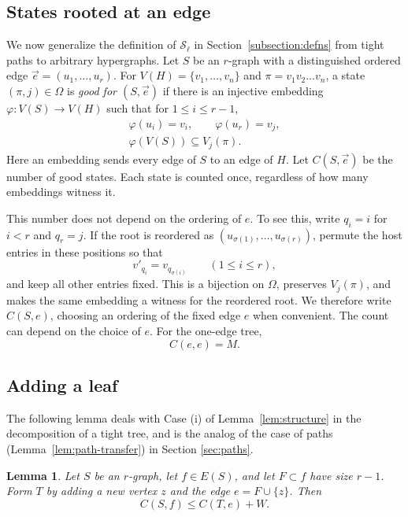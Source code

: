\documentclass[11pt]{article}
\newtheorem{lemma}[theorem]{Lemma}
\theoremstyle{remark}
\numberwithin{equation}{section}
\begin{document}
	\subsection{States rooted at an edge}\label{subsec:rooted-states}
	We now generalize the definition of ${\mathcal S}_{\ell}$ in Section~\ref{subsection:defns} from tight paths to arbitrary hypergraphs.
	Let $S$ be an $r$-graph with a distinguished ordered edge
	$\vec e=(u_1,\ldots,u_r)$. For $V(H)=\{v_1, \ldots, v_n\}$ and $\pi=v_1v_2\ldots v_n$, a state $(\pi,j)\in\Omega$ is
	\emph{good for $(S,\vec e)$} if there is an injective embedding
	$\varphi:V(S)\longrightarrow V(H)$ such that for $1 \leq i \leq r-1$,
	\begin{equation}\label{eq:rooted-state}
		\begin{gathered}
			\varphi(u_i)=v_i,\qquad \varphi(u_r)=v_j,\\
			\varphi(V(S))\subseteq V_j(\pi).
		\end{gathered}
	\end{equation}
	Here an embedding sends every edge of $S$ to an edge of $H$.
	Let $C(S,\vec e)$ be the number of good states. Each state is
	counted once, regardless of how many embeddings witness it.
	
	This number does not depend on the ordering of $e$. To see this,
	write $q_i=i$ for $i<r$ and $q_r=j$. If the root is reordered as
	$(u_{\sigma(1)},\ldots,u_{\sigma(r)})$, permute the host entries
	in these positions so that
	\[
	v'_{q_i}=v_{q_{\sigma(i)}}\qquad(1\le i\le r),
	\]
	and keep all other entries fixed. This is a bijection on $\Omega$,
	preserves $V_j(\pi)$, and makes the same embedding a witness for
	the reordered root. We therefore write $C(S,e)$, choosing an
	ordering of the fixed edge $e$ when convenient. The count can
	depend on the choice of $e$. For the one-edge tree,
	\begin{equation}\label{eq:rooted-base}
		C(e,e)=M.
	\end{equation}
	
	\subsection{Adding a leaf}\label{subsec:operationsleaf}
	
	The following lemma deals with Case (i) of Lemma~\ref{lem:structure} in the decomposition of a tight tree, and is the analog of the case of paths (Lemma~\ref{lem:path-transfer}) in Section \ref{sec:paths}.
	
	\begin{lemma}\label{lem:leaf}
		Let $S$ be an $r$-graph, let $f\in E(S)$, and let $F\subset f$
		have size $r-1$. Form $T$ by adding a new vertex $z$ and the
		edge $e=F\cup\{z\}$. Then
		\begin{equation}\label{eq:leaf}
			C(S,f)\le C(T,e)+W.
		\end{equation}
	\end{lemma}
	
\end{document}
